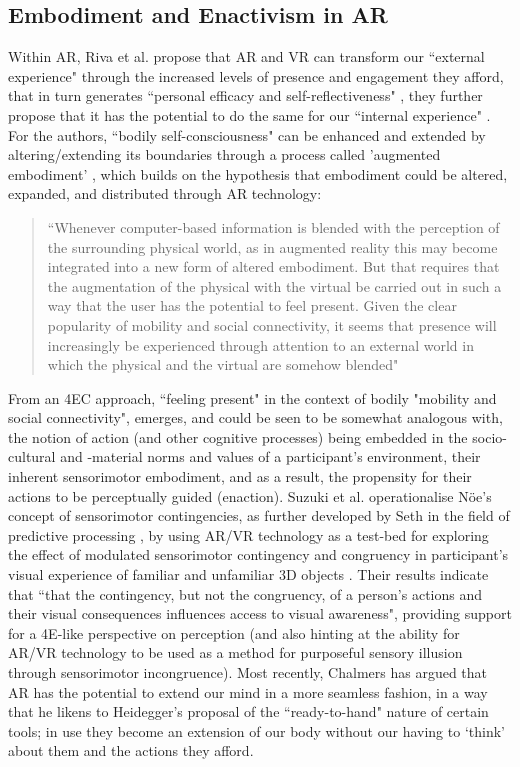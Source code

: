 \subsection{Embodiment and Enactivism in AR}\label{sec: theory-embodimentar}
Within AR, Riva et al. propose that AR and VR can transform our ``external experience" through the increased levels of presence and engagement they afford, that in turn generates ``personal efficacy and self-reflectiveness" \citeyearpar[p. 10]{riva2016}, they further propose that it has the potential to do the same for our ``internal experience" . For the authors, ``bodily self-consciousness" can be enhanced and extended by altering/extending its boundaries through a process called 'augmented embodiment' , which builds on the hypothesis that embodiment could be altered, expanded, and distributed through AR technology: 
\begin{quote}
    ``Whenever computer-based information is blended with the perception of the surrounding physical world, as in augmented reality this may become integrated into a new form of altered embodiment. But that requires that the augmentation of the physical with the virtual be carried out in such a way that the user has the potential to feel present. Given the clear popularity of mobility and social connectivity, it seems that presence will increasingly be experienced through attention to an external world in which the physical and the virtual are somehow blended" \citep[]{waterworth2014}
\end{quote}
From an 4EC approach, ``feeling present" in the context of bodily "mobility and social connectivity", emerges, and could be seen to be somewhat analogous with, the notion of action (and other cognitive processes) being embedded in the  socio-cultural and -material norms and values of a participant's environment, their inherent sensorimotor embodiment, and as a result, the propensity for their actions to be perceptually guided (enaction). Suzuki et al. operationalise Nöe's \citeyearpar[]{noe2004} concept of sensorimotor contingencies, as further developed by Seth in the field of predictive processing \citeyearpar[]{seth2014}, by using AR/VR technology as a test-bed for exploring the effect of modulated sensorimotor contingency and congruency in participant's visual experience of familiar and unfamiliar 3D objects \citep[]{suzuki2019}. Their results indicate that ``that the contingency, but not the congruency, of a person's actions and their visual consequences influences access to visual awareness", providing support for a 4E-like perspective on perception (and also hinting at the ability for AR/VR technology to be used as a method for purposeful sensory illusion through sensorimotor incongruence). Most recently, Chalmers has argued that AR has the potential to extend our mind in a more seamless fashion, in a way that he likens to Heidegger's proposal of the ``ready-to-hand" nature of certain tools; in use they become an extension of our body without our having to `think' about them and the actions they afford.
